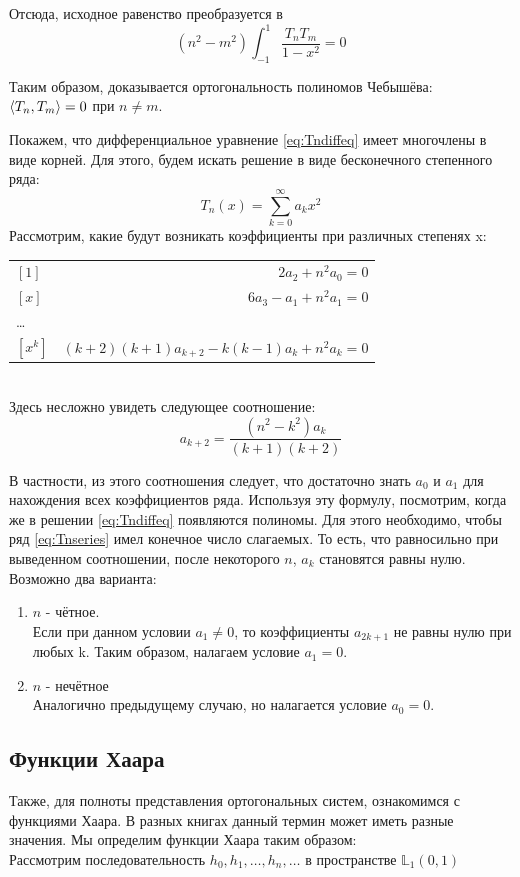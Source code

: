 \documentclass[12pt]{article}
\begin{document}
	Отсюда, исходное равенство преобразуется в
	$$(n^2 - m^2) \int_{-1}^{1} \frac{T_n T_m}{1-x^2} = 0$$
	
	Таким образом, доказывается ортогональность полиномов Чебышёва: $\left\langle T_n, T_m \right\rangle = 0$ при $n \neq m$.
	
	Покажем, что дифференциальное уравнение \eqref{eq:Tndiffeq} имеет многочлены в виде корней. Для этого, будем искать
	решение в виде бесконечного степенного ряда: 
	\begin{equation} \label{eq:Tnseries}
		T_n(x) = \sum_{k=0}^{\infty} a_k x^2
	\end{equation}
	Рассмотрим, какие будут возникать коэффициенты при различных степенях x: \\
	\begin{tabular}{l r}
		$[1]$ & $ 2a_2 + n^2 a_0 = 0 $ \\
		$[x]$ & $ 6a_3 - a_1 + n^2a_1 = 0 $ \\
		\dots \\
		$[x^k]$ & $ (k+2)(k+1) a_{k+2} - k(k-1) a_k + n^2 a_k = 0 $
	\end{tabular} \\
	Здесь несложно увидеть следующее соотношение:
	$$ a_{k+2} = \frac{(n^2 - k^2) a_k}{(k+1)(k+2)}$$
	
	В частности, из этого соотношения следует, что достаточно знать $a_0$ и $a_1$ для нахождения всех коэффициентов ряда.
	Используя эту формулу, посмотрим, когда же в решении \eqref{eq:Tndiffeq} появляются полиномы. Для этого необходимо, 
	чтобы ряд \eqref{eq:Tnseries} имел конечное число слагаемых. То есть, что равносильно при выведенном соотношении, 
	после некоторого $n$, $a_k$ становятся равны нулю. Возможно два варианта:
	\begin{enumerate}
		\item $n$ - чётное. \\
		Если при данном условии $a_1 \neq 0$, то коэффициенты $a_{2k+1}$ не равны нулю при любых k. Таким образом, налагаем
		условие $a_1 = 0$.
		\item $n$ - нечётное \\
		Аналогично предыдущему случаю, но налагается условие $a_0 = 0$.
	\end{enumerate}
	
	\subsection{Функции Хаара}
	
	Также, для полноты представления ортогональных систем, ознакомимся с функциями Хаара. В разных книгах данный термин
	может иметь разные значения. Мы определим функции Хаара таким образом: \\
	Рассмотрим последовательность $h_0, h_1, \dots, h_n, \dots$ в пространстве $\mathbb{L}_1(0, 1)$
	
\end{document}
